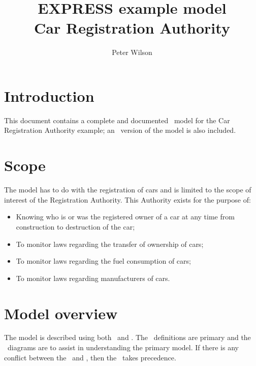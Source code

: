 \documentclass{article}
\title{EXPRESS example model \\ Car Registration Authority}
\author{Peter Wilson}
\date{}
\begin{document}
\maketitle

\tableofcontents
\listoffigures
\clearpage



\makeatletter \@topnum\z@ \makeatother
\section{Introduction}

 This document contains a complete and documented \Express\ model for the
Car Registration Authority example; an \ExpressG\ version of the model is also
included.

\section{Scope}

The model has to do with the registration of cars and is limited to the scope
of interest of the Registration Authority. This Authority exists for the
purpose of:

\begin{itemize}

\item Knowing who is or was the registered owner of a car at any time from
construction to destruction of the car;

\item To monitor laws regarding the transfer of ownership of cars;

\item To monitor laws regarding the fuel consumption of cars;

\item To monitor laws regarding manufacturers of cars.

\end{itemize}

\section{Model overview}

    The model is described using both \Express\ and \ExpressG. The \Express\
definitions are primary and the \ExpressG\ diagrams are to assist in
understanding the primary model. If there is any conflict between the
\Express\ and \ExpressG, then the \Express\ takes precedence.
\end{document}
